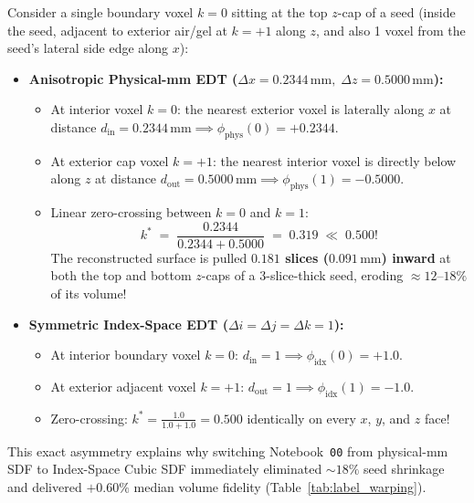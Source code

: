 \documentclass[10pt,a4paper]{article}
\renewcommand{\_}{\origunderscore\allowbreak}
\begin{document}
\begin{tcolorbox}[enhanced, colback=amberbg, colframe=amberwarn, arc=2pt, left=7pt, right=7pt, top=5pt, bottom=5pt,
  title={\textbf{Worked Numerical Proof: Physical-mm vs.\ Index-Space SDF Zero-Crossing on an Anisotropic Seed}}]
Consider a single boundary voxel $k=0$ sitting at the top $z$-cap of a seed (inside the seed, adjacent to exterior air/gel at $k=+1$ along $z$, and also 1 voxel from the seed's lateral side edge along $x$):
\begin{itemize}[itemsep=1.5pt, topsep=2pt]
    \item \textbf{Anisotropic Physical-mm EDT ($\Delta x = 0.2344\,\text{mm},\; \Delta z = 0.5000\,\text{mm}$):}
    \begin{itemize}
        \item At interior voxel $k=0$: the nearest exterior voxel is laterally along $x$ at distance $d_{\text{in}} = 0.2344\,\text{mm} \implies \phi_{\text{phys}}(0) = +0.2344$.
        \item At exterior cap voxel $k=+1$: the nearest interior voxel is directly below along $z$ at distance $d_{\text{out}} = 0.5000\,\text{mm} \implies \phi_{\text{phys}}(1) = -0.5000$.
        \item Linear zero-crossing between $k=0$ and $k=1$:
        \[
            k^* \;=\; \frac{0.2344}{0.2344 + 0.5000} \;=\; \mathbf{0.319} \;\ll\; 0.500!
        \]
        The reconstructed surface is pulled \textbf{$0.181$ slices ($0.091\,\text{mm}$) inward} at both the top and bottom $z$-caps of a $3$-slice-thick seed, eroding $\approx 12\text{--}18\%$ of its volume!
    \end{itemize}
    \item \textbf{Symmetric Index-Space EDT ($\Delta i = \Delta j = \Delta k = 1$):}
    \begin{itemize}
        \item At interior boundary voxel $k=0$: $d_{\text{in}} = 1 \implies \phi_{\text{idx}}(0) = +1.0$.
        \item At exterior adjacent voxel $k=+1$: $d_{\text{out}} = 1 \implies \phi_{\text{idx}}(1) = -1.0$.
        \item Zero-crossing: $k^* = \frac{1.0}{1.0 + 1.0} = \mathbf{0.500}$ identically on every $x$, $y$, and $z$ face!
    \end{itemize}
\end{itemize}
This exact asymmetry explains why switching Notebook~\texttt{00} from physical-mm SDF to Index-Space Cubic SDF immediately eliminated $\sim 18\%$ seed shrinkage and delivered $+0.60\%$ median volume fidelity (Table~\ref{tab:label_warping}).
\end{tcolorbox}
\end{document}
